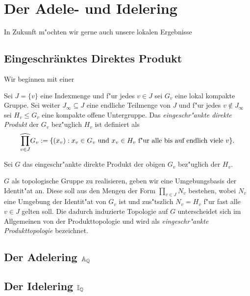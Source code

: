 \section{Der Adele- und Idelering}
	In Zukunft m"ochten wir gerne auch unsere lokalen Ergebnisse 
	\subsection{Eingeschränktes Direktes Produkt}
		Wir beginnen mit einer
		\begin{defi}
			Sei $J=\{v\}$ eine Indexmenge und f"ur jedes $v \in J$ sei $G_v$ eine lokal kompakte Gruppe. 
			Sei weiter $J_\infty \subseteq J$ eine endliche Teilmenge von $J$ und f"ur jedes $v \notin J_\infty$ sei $H_v\leq G_v$ eine kompakte offene Untergruppe. 
			Das \textit{eingeschr"ankte direkte Produkt} der $G_v$ bez"uglich $H_v$ ist definiert als 
			\begin{align*}
				\widehat{\prod\limits_{v \in J}} G_v := \{ (x_v): x_v \in G_v \text{ und } x_v \in H_v \text{ f"ur alle bis auf endlich viele } v \}.
			\end{align*}
		\end{defi}
		Sei $G$ das eingeschr"ankte direkte Produkt der obigen $G_v$ bez"uglich der $H_v$. 
		
		$G$ als topologische Gruppe zu realisieren, geben wir eine Umgebungsbasis der Identit"at an. Diese soll aus den Mengen der Form $\prod_{v \in J}{N_v}$ bestehen, wobei $N_v$ eine Umgebung der Identit"at von $G_v$ ist und zus"tszlich $N_v = H_v$ f"ur fast alle $v\in J$ gelten soll. Die dadurch induzierte Topologie auf $G$ unterscheidet sich im Allgemeinen von der Produkttopologie und wird als \textit{eingeschr"ankte Produkttopologie} bezeichnet.
		
		
	\subsection{Der Adelering $\mathbb{A}_{\mathbb{Q}}$}
	\subsection{Der Idelering $\mathbb{I}_{\mathbb{Q}}$}
	